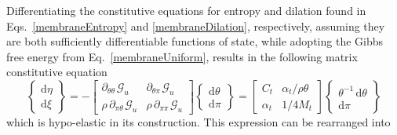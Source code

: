 Differentiating the constitutive equations for entropy and dilation found in Eqs.~\ref{membraneEntropy} and \ref{membraneDilation}, respectively, assuming they are both sufficiently differentiable functions of state, while adopting the Gibbs free energy from Eq.~\ref{membraneUniform}, results in the following matrix constitutive equation
\begin{displaymath}
\left\{ \begin{matrix}
\mathrm{d} \eta \\ \mathrm{d} \xi
\end{matrix} \right\} = -\begin{bmatrix}
\partial_{\theta\theta\,} \mathcal{G}_u & \partial_{\theta\pi\,} \mathcal{G}_u \\
\rho \, \partial_{\pi\theta\,} \mathcal{G}_u & \rho \, \partial_{\pi\pi\,} \mathcal{G}_u
\end{bmatrix} 
\left\{ \begin{matrix}
\mathrm{d} \theta \\ \mathrm{d} \pi
\end{matrix} \right\} = \begin{bmatrix}
C_t & \alpha_t / \rho \theta \\ \alpha_t & 1 / 4 M_t
\end{bmatrix} \left\{ \begin{matrix}
\theta^{-1} \, \mathrm{d} \theta \\ \mathrm{d} \pi
\end{matrix} \right\}
\end{displaymath}
which is hypo-elastic in its construction. \cite{Truesdell55}  This expression can be rearranged into
